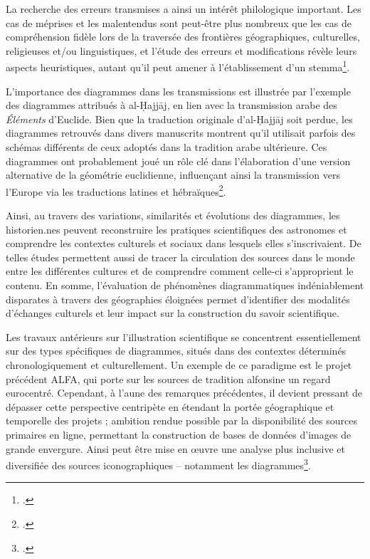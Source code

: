 La recherche des erreurs
transmises a ainsi un intérêt philologique important. Les cas de
méprises et les malentendus sont peut-être plus nombreux que les cas de
compréhension fidèle lors de la traversée des frontières géographiques,
culturelles, religieuses et/ou linguistiques, et l'étude des erreurs et modifications
révèle leurs aspects heuristiques, autant qu'il peut amener à
l'établissement d'un stemma\footcite{raynaud_building_2014}.

L'importance des diagrammes dans les transmissions est illustrée par l'exemple des diagrammes attribués à al-Ḥajjāj, en lien avec la transmission arabe des \emph{Éléments} d'Euclide. Bien que la traduction originale d'al-Ḥajjāj soit perdue, les diagrammes retrouvés dans divers manuscrits montrent qu'il utilisait parfois des schémas différents de ceux adoptés dans la tradition arabe ultérieure. Ces diagrammes ont probablement joué un rôle clé dans l'élaboration d'une version alternative de la géométrie euclidienne, influençant ainsi la transmission vers l'Europe via les traductions latines et hébraïques\footcite{de_young_editing_2014}.

Ainsi, au travers des variations, similarités et évolutions des
diagrammes, les historien.nes peuvent reconstruire les pratiques
scientifiques des astronomes et comprendre les contextes culturels et
sociaux dans lesquels elles s'inscrivaient. De telles études permettent
aussi de tracer la circulation des sources dans le monde entre les
différentes cultures et de comprendre comment celle-ci s'approprient le
contenu. En somme, l'évaluation de phénomènes diagrammatiques
indéniablement disparates à travers des géographies éloignées permet
d'identifier des modalités d'échanges culturels et leur impact sur la
construction du savoir scientifique.

Les travaux antérieurs sur l'illustration scientifique se concentrent
essentiellement sur des types spécifiques de diagrammes, situés dans des
contextes déterminés chronologiquement et culturellement. Un exemple de
ce paradigme est le projet précédent ALFA, qui porte sur les sources
de tradition alfonsine un regard eurocentré. Cependant, à
l'aune des remarques précédentes, il devient pressant de dépasser cette
perspective centripète en étendant la portée géographique et temporelle
des projets ; ambition rendue possible par la disponibilité des sources
primaires en ligne, permettant la construction de bases de données
d'images de grande envergure. Ainsi peut être mise en œuvre une analyse
plus inclusive et diversifiée des sources iconographiques -- notamment
les diagrammes\footcite{husson_eida_2022}.

